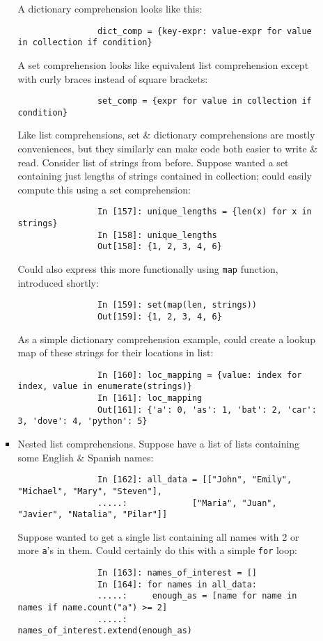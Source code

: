 \documentclass{article}
\begin{document}
\begin{itemize}
\begin{itemize}
\begin{itemize}
			A dictionary comprehension looks like this:
			\begin{verbatim}
				dict_comp = {key-expr: value-expr for value in collection if condition}
			\end{verbatim}
			A set comprehension looks like equivalent list comprehension except with curly braces instead of square brackets:
			\begin{verbatim}
				set_comp = {expr for value in collection if condition}
			\end{verbatim}
			Like list comprehensions, set \& dictionary comprehensions are mostly conveniences, but they similarly can make code both easier to write \& read. Consider list of strings from before. Suppose wanted a set containing just lengths of strings contained in collection; could easily compute this using a set comprehension:
			\begin{verbatim}
				In [157]: unique_lengths = {len(x) for x in strings}
				In [158]: unique_lengths
				Out[158]: {1, 2, 3, 4, 6}
			\end{verbatim}
			Could also express this more functionally using {\tt map} function, introduced shortly:
			\begin{verbatim}
				In [159]: set(map(len, strings))
				Out[159]: {1, 2, 3, 4, 6}
			\end{verbatim}
			As a simple dictionary comprehension example, could create a lookup map of these strings for their locations in list:
			\begin{verbatim}
				In [160]: loc_mapping = {value: index for index, value in enumerate(strings)}
				In [161]: loc_mapping
				Out[161]: {'a': 0, 'as': 1, 'bat': 2, 'car': 3, 'dove': 4, 'python': 5}
			\end{verbatim}
			\item {\sf Nested list comprehensions.} Suppose have a list of lists containing some English \& Spanish names:
			\begin{verbatim}
				In [162]: all_data = [["John", "Emily", "Michael", "Mary", "Steven"],
				.....:             ["Maria", "Juan", "Javier", "Natalia", "Pilar"]]
			\end{verbatim}
			Suppose wanted to get a single list containing all names with 2 or more {\tt a}'s in them. Could certainly do this with a simple {\tt for} loop:
			\begin{verbatim}
				In [163]: names_of_interest = []
				In [164]: for names in all_data:
				.....:     enough_as = [name for name in names if name.count("a") >= 2]
				.....:     names_of_interest.extend(enough_as)

\end{verbatim}
\end{itemize}
\end{itemize}
\end{itemize}
\end{document}
